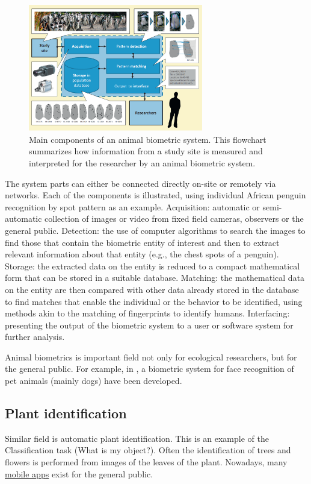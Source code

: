 \begin{figure}[H]
\begin{center}
\includegraphics[width=0.68\textwidth]{fig/PhotoIDPenguins}
\end{center}
\caption{Main components of an animal biometric system. This flowchart summarizes how information from a study site is measured and interpreted for the researcher by
an animal biometric system.}
\label{fig:photoIDpen}
\end{figure}
The system parts can either be connected directly on-site or remotely via networks. Each of the components is illustrated, using individual African penguin recognition by spot pattern as an example.  Acquisition: automatic or semi-automatic collection of images or video from fixed field cameras, observers or
the general public. Detection: the use of computer algorithms to search the images to find those that contain the biometric entity of interest and then to extract relevant
information about that entity (e.g., the chest spots of a penguin). Storage: the extracted data on the entity is reduced to a compact mathematical form that can be stored in a
suitable database. Matching: the mathematical data on the entity are then compared with other data already stored in the database to find matches that enable the
individual or the behavior to be identified, using methods akin to the matching of fingerprints to identify humans. Interfacing: presenting the output of the biometric system
to a user or software system for further analysis.

Animal biometrics is important field not only for ecological researchers, but for the general public. For example, in \cite{Kumar2014}, a biometric system for face recognition of pet animals (mainly dogs) have been developed.

\subsection{Plant identification}
Similar field is automatic plant identification. This is an example of the Classification task (What is my object?). Often the identification of trees and flowers is performed from images of the leaves of the plant. Nowadays, many \href{http://www.gardenista.com/posts/diy-identify-leaves-and-flowers-theres-an-app-for-that}{\underline{mobile app}s} exist for the general public.

